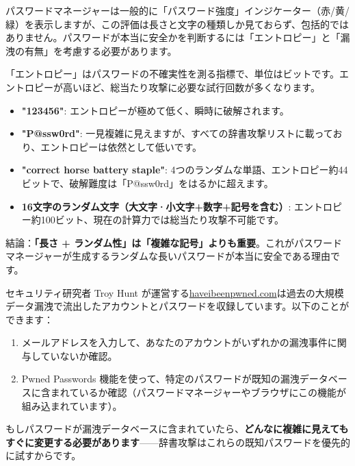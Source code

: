 
パスワードマネージャーは一般的に「パスワード強度」インジケーター（赤/黄/緑）を表示しますが、この評価は長さと文字の種類しか見ておらず、包括的ではありません。パスワードが本当に安全かを判断するには「エントロピー」と「漏洩の有無」を考慮する必要があります。


「エントロピー」はパスワードの不確実性を測る指標で、単位はビットです。エントロピーが高いほど、総当たり攻撃に必要な試行回数が多くなります。

\begin{itemize}
  \item \textbf{"123456"}: エントロピーが極めて低く、瞬時に破解されます。
  \item \textbf{"P@ssw0rd"}: 一見複雑に見えますが、すべての辞書攻撃リストに載っており、エントロピーは依然として低いです。
  \item \textbf{"correct horse battery staple"}: 4つのランダムな単語、エントロピー約44ビットで、破解難度は「P@ssw0rd」をはるかに超えます。
  \item \textbf{16文字のランダム文字（大文字·小文字+数字+記号を含む）}: エントロピー約100ビット、現在の計算力では総当たり攻撃不可能です。
\end{itemize}

結論：\textbf{「長さ + ランダム性」は「複雑な記号」よりも重要}。これがパスワードマネージャーが生成するランダムな長いパスワードが本当に安全である理由です。


セキュリティ研究者 Troy Hunt が運営する\href{https://haveibeenpwned.com}{haveibeenpwned.com}は過去の大規模データ漏洩で流出したアカウントとパスワードを収録しています。以下のことができます：

\begin{enumerate}
  \item メールアドレスを入力して、あなたのアカウントがいずれかの漏洩事件に関与していないか確認。
  \item Pwned Passwords 機能を使って、特定のパスワードが既知の漏洩データベースに含まれているか確認（パスワードマネージャーやブラウザにこの機能が組み込まれています）。
\end{enumerate}

もしパスワードが漏洩データベースに含まれていたら、\textbf{どんなに複雑に見えてもすぐに変更する必要があります}——辞書攻撃はこれらの既知パスワードを優先的に試すからです。

